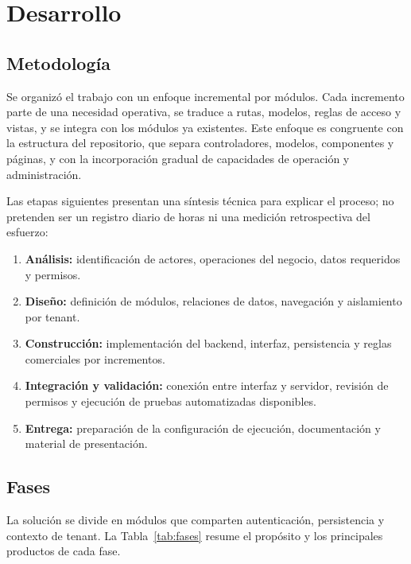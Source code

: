 \chapter{Desarrollo}

\section{Metodología}

Se organizó el trabajo con un enfoque incremental por módulos. Cada incremento parte de una necesidad operativa, se traduce a rutas, modelos, reglas de acceso y vistas, y se integra con los módulos ya existentes. Este enfoque es congruente con la estructura del repositorio, que separa controladores, modelos, componentes y páginas, y con la incorporación gradual de capacidades de operación y administración.

Las etapas siguientes presentan una síntesis técnica para explicar el proceso; no pretenden ser un registro diario de horas ni una medición retrospectiva del esfuerzo:
\begin{enumerate}
  \item \textbf{Análisis:} identificación de actores, operaciones del negocio, datos requeridos y permisos.
  \item \textbf{Diseño:} definición de módulos, relaciones de datos, navegación y aislamiento por tenant.
  \item \textbf{Construcción:} implementación del backend, interfaz, persistencia y reglas comerciales por incrementos.
  \item \textbf{Integración y validación:} conexión entre interfaz y servidor, revisión de permisos y ejecución de pruebas automatizadas disponibles.
  \item \textbf{Entrega:} preparación de la configuración de ejecución, documentación y material de presentación.
\end{enumerate}

\section{Fases}

La solución se divide en módulos que comparten autenticación, persistencia y contexto de tenant. La Tabla~\ref{tab:fases} resume el propósito y los principales productos de cada fase.

